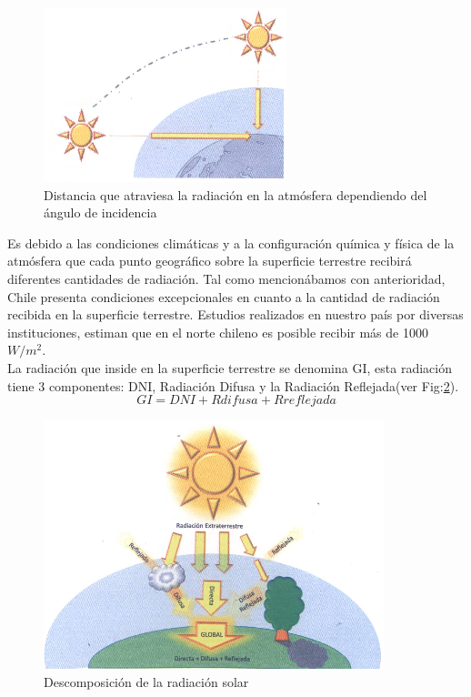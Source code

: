 \begin{figure}[h!]
        \centering
        \includegraphics[scale=0.7]{images/espesorAtmosfera}
        \caption{Distancia que atraviesa la radiación en la atmósfera dependiendo del ángulo de incidencia}
	\label{fig:atmosfera}
\end{figure}

Es debido a las condiciones climáticas y a la configuración química y física de la atmósfera que cada punto geográfico sobre la superficie terrestre recibirá diferentes cantidades de radiación. Tal como mencionábamos con anterioridad, Chile presenta condiciones excepcionales en cuanto a la cantidad de radiación recibida en la superficie terrestre. Estudios realizados en nuestro país por diversas instituciones\cite{recursoSolar:2}, estiman que en el norte chileno es posible recibir más de 1000 $W/{m}^{2}$.\\

La radiación que inside en la superficie terrestre se denomina GI, esta radiación tiene 3 componentes: DNI, Radiación Difusa y la Radiación Reflejada(ver Fig:\ref{fig:componentes}). \\ $$ GI = DNI + Rdifusa + Rreflejada $$

\begin{figure}[h!]
        \centering
        \includegraphics[scale=0.7]{images/radiacionDescompocicion}
        \caption{Descomposición de la radiación solar\cite{recursoSolar:1}}
	\label{fig:componentes}
\end{figure}

